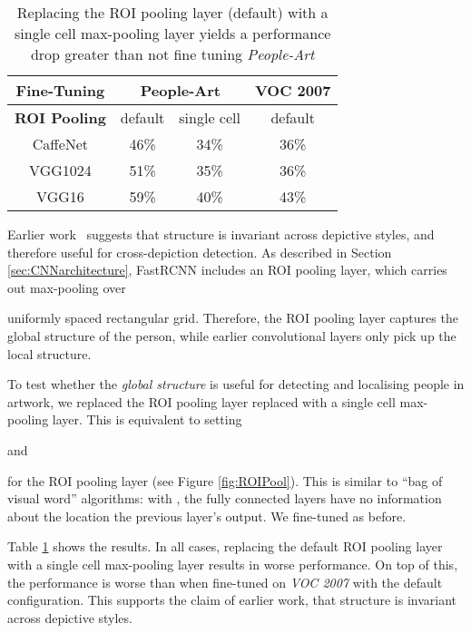 \documentclass[runningheads]{llncs}
\begin{document}
\begin{table}[t]
  \begin{center}
    \caption{Replacing the \ac{ROI} pooling layer (default) with a single cell max-pooling layer yields a performance drop greater than not fine tuning \textit{People-Art} \label{tbl:PerformanceStructure}}
\begin{tabular}{c|ccc}
  \hline 

  \textbf{Fine-Tuning} & \multicolumn{2}{c}{People-Art} & VOC 2007  \\ 

  \hline 

  \textbf{ROI Pooling} & default & single cell & default  \\ 
  \hline
  CaffeNet & 46\% & 34\% & 36\% \\ 
  VGG1024 & 51\% & 35\% & 36\% \\ 
  VGG16 & 59\% & 40\% & 43\% \\ 
  \hline
\end{tabular}   \end{center}
\end{table}

Earlier work~\cite{wu2014learning,xiao2008structure,xiao2011learning} suggests that structure is invariant across depictive styles, and therefore useful for cross-depiction detection.
As described in Section \ref{sec:CNNarchitecture}, \ac{FastRCNN} includes an \ac{ROI} pooling layer, which carries out max-pooling over

uniformly spaced rectangular grid.
Therefore, the \ac{ROI} pooling layer captures the global structure of the person, while earlier convolutional layers only pick up the local structure.

To test whether the \emph{global structure} is useful for detecting and localising people in \ac{artwork}, we replaced the \ac{ROI} pooling layer replaced with a single cell max-pooling layer.
This is equivalent to setting

and

for the \ac{ROI} pooling layer (see Figure \ref{fig:ROIPool}).
This is similar to ``bag of visual word'' algorithms: with
, the fully connected layers have no information about the location the previous layer's output.
We fine-tuned as before.

Table \ref{tbl:PerformanceStructure} shows the results.
In all cases, replacing the default \ac{ROI} pooling layer with a single cell max-pooling layer results in worse performance.
On top of this, the performance is worse than when fine-tuned on \textit{VOC 2007} with the default configuration.
This supports the claim of earlier work, that structure is invariant across depictive styles.
 
\end{document}
